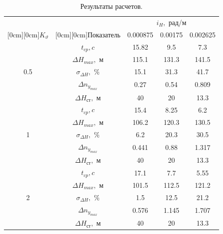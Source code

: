 \begin{enumerate}
    
    \begin{table}[H]
        \caption{\label{tab:Результаты расчётов} Результаты расчетов.}
        \begin{center}
            \begin{tabular}{|c|c|c|c|c|}
            \hline
            & \multicolumn{1}{|c|}{} & \multicolumn{3}{|c|}{$i_H,$ рад/м}  \\
            \cline{3-5}
            \raisebox{1.5ex}[0cm][0cm]{$K_{\vartheta}$} & \raisebox{1.5ex}[0cm][0cm]{Показатель}
            & 0.000875 & 0.00175 &0.002625\\
            \hline
            & $t_{cp}, c$ & 15.82 & 9.5 & 7.3\\ 
            \cline{2-5} 
            & $\Delta H_{max},$ м & 115.1 & 131.3 & 141.5\\ 
            \cline{2-5} 
            0.5& $\sigma_{\Delta H},$ \% & 15.1 & 31.3 & 41.7\\ 
            \cline{2-5} 
            & $\Delta n_{y_{max}}$ & 0.27 & 0.54 & 0.809\\ 
            \cline{2-5} 
            & $\Delta H_{\text{ст}},$ м & 40 & 20 & 13.3\\ 
            \hline
            & $t_{cp}, c$ & 15.4 & 8.25 & 6.2\\
            \cline{2-5} 
            & $\Delta H_{max},$ м & 106.2 & 120.3 & 130.5\\ 
            \cline{2-5} 
            1& $\sigma_{\Delta H},$ \% & 6.2 & 20.3 & 30.5\\ 
            \cline{2-5} 
            & $\Delta n_{y_{max}}$ & 0.441 & 0.88 & 1.317\\ 
            \cline{2-5} 
            & $\Delta H_{\text{ст}},$ м & 40 & 20 & 13.3\\
            \hline
            & $t_{cp}, c$ & 17.1 & 7.7 & 5.55\\
            \cline{2-5} 
            & $\Delta H_{max},$ м & 101.5 & 112.5 & 121.2\\ 
            \cline{2-5} 
            2& $\sigma_{\Delta H},$ \% & 1.5 & 12.5 & 21.2\\ 
            \cline{2-5} 
            & $\Delta n_{y_{max}}$ & 0.576 & 1.145 & 1.707\\ 
            \cline{2-5} 
            & $\Delta H_{\text{ст}},$ м & 40 & 20 & 13.3\\ 
            \hline
            \end{tabular}
        \end{center}
    \end{table}


\end{enumerate}
